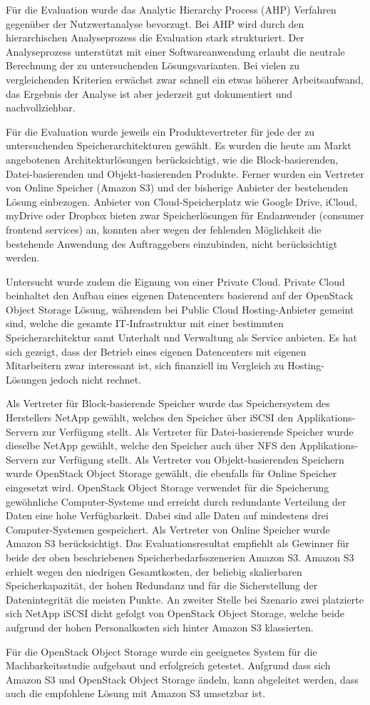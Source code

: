 Für die Evaluation wurde das Analytic Hierarchy Process (AHP) Verfahren gegenüber der Nutzwertanalyse bevorzugt. Bei AHP wird durch den hierarchischen Analyseprozess die Evaluation stark strukturiert. Der Analyseprozess unterstützt mit einer Softwareanwendung erlaubt die neutrale Berechnung der zu untersuchenden Lösungsvarianten. Bei vielen zu vergleichenden Kriterien erwächst zwar schnell ein etwas höherer Arbeitsaufwand, das Ergebnis der Analyse ist aber jederzeit gut dokumentiert und nachvollziehbar.

Für die Evaluation wurde jeweils ein Produktevertreter für jede der zu untersuchenden Speicherarchitekturen gewählt. Es wurden die heute am Markt angebotenen Architekturlösungen berücksichtigt, wie die Block-basierenden, Datei-basierenden und Objekt-basierenden Produkte. Ferner wurden ein Vertreter von Online Speicher (Amazon S3) und der bisherige Anbieter der bestehenden Lösung einbezogen. Anbieter von Cloud-Speicherplatz wie Google Drive, iCloud, myDrive oder Dropbox bieten zwar Speicherlösungen für Endanwender (consumer frontend services) an, konnten aber wegen der fehlenden Möglichkeit die bestehende Anwendung des Auftraggebers einzubinden, nicht berücksichtigt werden. 

Untersucht wurde zudem die Eignung von einer Private Cloud. Private Cloud beinhaltet den Aufbau eines eigenen Datencenters basierend auf der OpenStack Object Storage Lösung, währendem bei Public Cloud Hosting-Anbieter gemeint sind, welche die gesamte IT-Infrastruktur mit einer bestimmten Speicherarchitektur samt Unterhalt und Verwaltung als Service anbieten. Es hat sich gezeigt, dass der Betrieb eines eigenen Datencenters mit eigenen Mitarbeitern zwar interessant ist, sich finanziell im Vergleich zu Hosting-Lösungen jedoch nicht rechnet.

Als Vertreter für Block-basierende Speicher wurde das Speichersystem des Herstellers NetApp gewählt, welches den Speicher über iSCSI den Applikations-Servern zur Verfügung stellt. Als Vertreter für Datei-basierende Speicher wurde dieselbe NetApp gewählt, welche den Speicher auch über NFS den Applikations-Servern zur Verfügung stellt. Als Vertreter von Objekt-basierenden Speichern wurde OpenStack Object Storage gewählt, die ebenfalls für Online Speicher eingesetzt wird. OpenStack Object Storage verwendet für die Speicherung gewöhnliche Computer-Systeme und erreicht durch redundante Verteilung der Daten eine hohe Verfügbarkeit. Dabei sind alle Daten auf mindestens drei Computer-Systemen gespeichert. Als Vertreter von Online Speicher wurde Amazon S3 berücksichtigt.
Das Evaluationsresultat empfiehlt als Gewinner für beide der oben beschriebenen Speicherbedarfsszenerien Amazon S3. Amazon S3 erhielt wegen den niedrigen Gesamtkosten, der beliebig skalierbaren Speicherkapazität, der hohen Redundanz und für die Sicherstellung der Datenintegrität die meisten Punkte. An zweiter Stelle bei Szenario zwei platzierte sich NetApp iSCSI dicht gefolgt von OpenStack Object Storage, welche beide aufgrund der hohen Personalkosten sich hinter Amazon S3 klassierten.

Für die OpenStack Object Storage wurde ein geeignetes System für die Machbarkeitsstudie aufgebaut und erfolgreich getestet. Aufgrund dass sich Amazon S3 und OpenStack Object Storage ändeln, kann abgeleitet werden, dass auch die empfohlene Lösung mit Amazon S3 umsetzbar ist. 